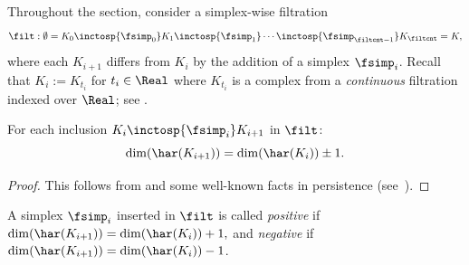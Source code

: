 Throughout the  section,
consider a simplex-wise filtration
\begin{equation*}
\filt: 
\emptyset
=K_0 \inctosp{\fsimp_0} K_1 \inctosp{\fsimp_1} 
\cdots \inctosp{\fsimp_{\filtcnt-1}} K_\filtcnt=K,
\end{equation*}
where each $K_{i+1}$ differs from $K_i$
by the addition of a simplex $\fsimp_i$. 
Recall that $K_i := K_{t_i}$ for $t_i\in\Real$ where $K_{t_i}$
is a complex from a \emph{continuous} filtration indexed over $\Real$; see . 


\begin{proposition}
\label{prop:arrow-dim-change}
For each inclusion $K_i \inctosp{\fsimp_i} K_{i+1}$ in $\filt$: 
\[\dim(\har(K_{i+1}))=\dim(\har(K_{i})) \pm 1.\]
\end{proposition}
\begin{proof}
This follows from  and some well-known facts in persistence (see~\cite{DeyWang2022,EdelsbrunnerLetscherZomorodian2002}).
\end{proof}

\begin{definition}
\label{def:pos-neg-simp}
A simplex $\fsimp_i$ inserted in $\filt$ is called \emph{positive}
if $\dim(\har(K_{i+1}))=\dim(\har(K_{i}))+1,$ and \emph{negative}
if $\dim(\har(K_{i+1}))=\dim(\har(K_{i}))-1$.
\end{definition}

